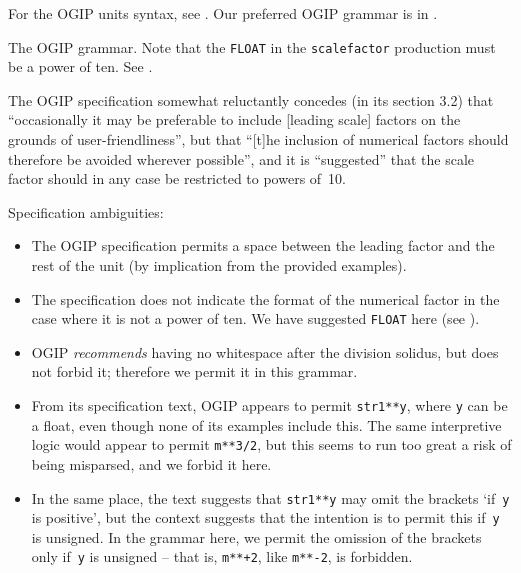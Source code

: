 \documentclass[11pt,notitlepage,onecolumn]{ivoa}
\begin{document}
For the OGIP units syntax, see \cite{george95}.  Our preferred OGIP
grammar is in .

\begin{table}[ht]

\caption[The OGIP grammar]{\label{tabx:ogipgrammar}The OGIP grammar.
Note that the \texttt{FLOAT} in the \texttt{scalefactor} production
must be a power of ten.
See .}
\end{table}

The OGIP specification somewhat reluctantly concedes (in its section
3.2) that ``occasionally it may be preferable to include [leading
scale] factors on the grounds of user-friendliness'', but that ``[t]he
inclusion of numerical factors should therefore be avoided wherever
possible'', and it is ``suggested'' that the scale factor should in any case
be restricted to powers of~10.

Specification ambiguities:
\begin{itemize}
\item The OGIP specification permits a space between the leading
  factor and the rest of the unit (by implication from the provided
  examples).
\item The specification does not indicate the format of the numerical
  factor in the case where it is not a power of ten.  We have
  suggested \texttt{FLOAT} here (see ).
\item OGIP \emph{recommends} having no whitespace after the division
  solidus, but does not forbid it; therefore we permit it in this
  grammar.
\item From its specification text, OGIP appears to permit
  \texttt{str1**y}, where \texttt{y} can be a float, even though none
  of its examples include this.  The same interpretive logic would
  appear to permit \texttt{m**3/2}, but this seems to run too great a
  risk of being misparsed, and we forbid it here.
\item In the same place, the text suggests that \texttt{str1**y} may
  omit the brackets `if~\texttt y is positive', but the context
  suggests that the intention is to permit this if~\texttt y is
  unsigned.  In the grammar here, we permit the omission of the
  brackets only if~\texttt y is unsigned -- that is, \texttt{m**+2},
  like \texttt{m**-2}, is forbidden.
\end{itemize}
\end{document}
